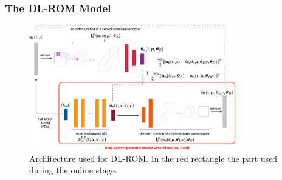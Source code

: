 \documentclass[11pt]{article}
\begin{document}
\subsubsection{The DL-ROM Model}
\begin{figure}[t]
    \centering
    \includegraphics[width=0.8\textwidth]{imgs/dlrom-arch.png}
    \caption{Architecture used for DL-ROM. In the red rectangle the part used during the online stage.}
    \label{fig:dlrom-arch-org}
\end{figure}
\end{document}
